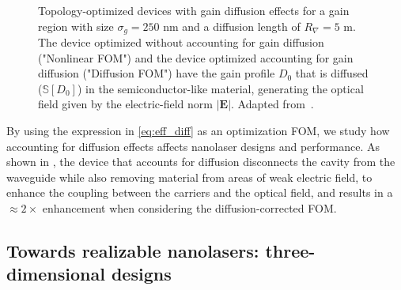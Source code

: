 \begin{figure}[tb]
    \centering
    \caption{Topology-optimized devices with gain diffusion effects for a gain region with size $\sigma_g=250$ nm and a diffusion length of $R_\nabla=5$ \textmu m. The device optimized without accounting for gain diffusion ("Nonlinear FOM") and the device optimized accounting for gain diffusion ("Diffusion FOM") have the gain profile $D_0$ that is diffused ($\mathbb{S}[D_0]$)
    in the semiconductor-like material, generating the optical field given by the electric-field norm $\vert \mathbf{E} \vert$. Adapted from~\cite{ownpub4}.}
    \label{fig:laser_diff}
\end{figure}

By using the expression in \eqref{eq:eff_diff} as an optimization FOM, we study how accounting for diffusion effects
affects nanolaser designs and performance. As shown in , the device that accounts for diffusion disconnects the cavity from the waveguide while also removing
material from areas of weak electric field, to 
enhance the coupling between the carriers and the optical field, and results in a $\approx 2\times$ enhancement when considering the diffusion-corrected FOM. 

\subsection*{Towards realizable nanolasers: three-dimensional designs}

